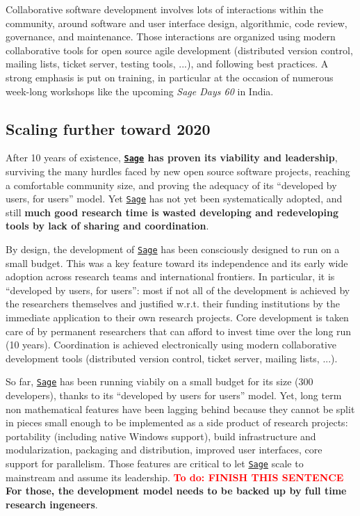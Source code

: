 \documentclass[a4,12pt]{amsart}
\newcommand{\sage}{\href{http://www.sagemath.org/}{\texttt{Sage}}\xspace}
\newcommand{\TODO}[2][To do: ]{{\textcolor{red}{\textbf{#1#2}}}}
\begin{document}
Collaborative software development involves lots of interactions
within the community, around software and user interface design,
algorithmic, code review, governance, and maintenance. Those
interactions are organized using modern collaborative tools for open
source agile development (distributed version control, mailing lists,
ticket server, testing tools, ...), and following best practices. A
strong emphasis is put on training, in particular at the occasion of
numerous week-long workshops like the upcoming \emph{Sage Days 60} in
India.

\subsection*{Scaling further toward 2020}

After 10 years of existence, \textbf{\sage has proven its viability
  and leadership}, surviving the many hurdles faced by new open source
software projects, reaching a comfortable community size, and proving
the adequacy of its ``developed by users, for users'' model.  Yet
\sage has not yet been systematically adopted, and still \textbf{much
  good research time is wasted developing and redeveloping tools by
  lack of sharing and coordination}.

By design, the development of \sage has been consciously designed to
run on a small budget. This was a key feature toward its independence
and its early wide adoption across research teams and international
frontiers. In particular, it is ``developed by users, for users'':
most if not all of the development is achieved by the researchers
themselves and justified w.r.t. their funding institutions by the
immediate application to their own research projects. Core development
is taken care of by permanent researchers that can afford to invest
time over the long run (10 years). Coordination is achieved
electronically using modern collaborative development tools
(distributed version control, ticket server, mailing lists, ...).

So far, \sage has been running viabily on a small budget for its size (300
developers), thanks to its ``developed by users for users'' model. Yet,
long term non mathematical features have been lagging behind because they cannot be
split in pieces small enough to be implemented as a side product of research
projects: portability (including native Windows support), build infrastructure
and modularization, packaging and distribution, improved user interfaces, core
support for parallelism. Those features are critical to let \sage scale to
mainstream and assume its leadership.
\TODO{FINISH THIS SENTENCE}
\textbf{For those, the
development model needs to be backed up by full time research
ingeneers}.
\end{document}
